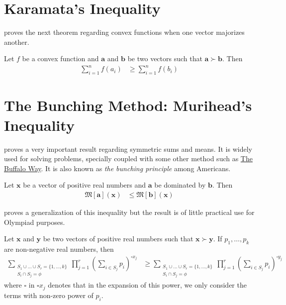 \documentclass[inequalities.tex]{subfile}
\begin{document}
	\section[Karamata]{Karamata's Inequality}\label{sec:karamata}
	\textcite{karamata_1932} proves the next theorem regarding convex functions when one vector majorizes another.
		\begin{theorem}
			Let $f$ be a convex function and $\mathbf{a}$ and $\mathbf{b}$ be two vectors such that $\mathbf{a}\succ\mathbf{b}$. Then
				\begin{align*}
					\sum_{i=1}^{n}f(a_{i})
						& \geq \sum_{i=1}^{n}f(b_{i})
				\end{align*}
		\end{theorem}
	\section[Bunching: Muirhead]{The Bunching Method: Murihead's Inequality}\label{sec:bunching}
	
	\textcite{muirhead_1902} proves a very important result regarding symmetric sums and means. It is widely used for solving problems, specially coupled with some other method such as \hyperref[sec:buffalo]{The Buffalo Way}. It is also known as \textit{the bunching principle} among Americans.
		\begin{theorem}\label{thm:muirhead}
			Let $\mathbf{x}$ be a vector of positive real numbers and $\mathbf{a}$ be dominated by $\mathbf{b}$. Then
				\begin{align*}
					\mathfrak{M}[\mathbf{a}](\mathbf{x})
						& \leq \mathfrak{M}[\mathbf{b}](\mathbf{x})
				\end{align*}
		\end{theorem}
	\textcite{paris_vencovska_2009} proves a generalization of this inequality but the result is of little practical use for Olympiad purposes.
		\begin{theorem}
			Let $\mathbf{x}$ and $\mathbf{y}$ be two vectors of positive real numbers such that $\mathbf{x}\succ\mathbf{y}$. If $p_{1},\ldots,p_{k}$ are non-negative real numbers, then
				\begin{align*}
					\sum_{\substack{S_{1}\cup\ldots\cup S_{r}=\{1,\ldots,k\}\\S_{i}\cap S_{j}=\phi}}\prod_{j=1}^{r}\left(\sum_{i\in S_{j}}p_{i}\right)^{\square x_{j}}
						& \geq \sum_{\substack{S_{1}\cup\ldots\cup S_{r}=\{1,\ldots,k\}\\S_{i}\cap S_{j}=\phi}}\prod_{j=1}^{r}\left(\sum_{i\in S_{j}}p_{i}\right)^{\square y_{j}}
				\end{align*}
			where $\square$ in $\square x_{j}$ denotes that in the expansion of this power, we only consider the terms with non-zero power of $p_{i}$.
		\end{theorem}
	
\end{document}
